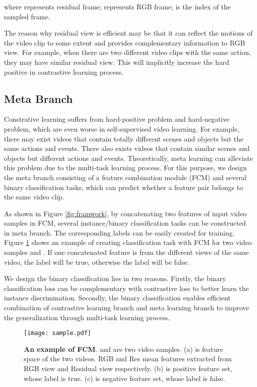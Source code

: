 \documentclass[10pt,twocolumn,letterpaper]{article}
\begin{document}
\noindent where  represents residual frame;  represents RGB frame;  is the index of the sampled frame.

The reason why residual view is efficient may be that it can reflect the motions of the video clip to some extent and provides complementary information to RGB view. For example, when there are two different video clips with the same action, they may have similar residual view. This will implicitly increase the hard positive in contrastive learning process.    

\subsection{Meta Branch}
\label{meta_branch}
Constrative learning suffers from hard-positive problem and hard-negative problem, which are even worse in self-supervised video learning. For example, there may exist videos that contain totally different scenes and objects but the same actions and events. There also exists videos that contain similar scenes and objects but different actions and events. Theoretically, meta learning can alleviate this problem due to the multi-task learning process. For this purpose, we design the meta branch consisting of a feature combination module (FCM) and several binary classification tasks, which can predict whether a feature pair belongs to the same video clip.  

As shown in Figure \ref{fig:framwork}, by concatenating two features of input video samples in FCM, several instance/binary classification tasks can be constructed in meta branch. The corresponding labels can be easily created for training. Figure \ref{fig:sample} shows an example of creating classification task with FCM for two video samples  and . If one concatenated feature is from the different views of the same video, the label will be true, otherwise the label will be false.

We design the binary classification lies in two reasons. Firstly, the binary classification loss can be complementary with contrastive loss to better learn the instance discrimination. Secondly, the binary classification enables efficient combination of contrastive learning branch and meta learning branch to improve the generalization through multi-task learning process. 

\begin{figure}[H]
\centering
\texttt{[image: sample.pdf]}
\caption{\textbf{An example of FCM}.  and  are two video samples. (a) is feature space of the two videos. RGB and Res mean features extracted from RGB view and Residual view respectively. (b) is positive feature set, whose label is true. (c) is negative feature set, whose label is false.}
\label{fig:sample}
\centering
\end{figure}
 
\end{document}
